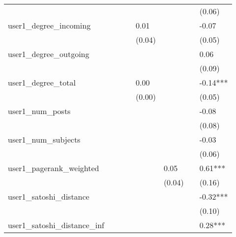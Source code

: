 \begin{table}
\begin{center}
\begin{tabular}{llllllll}
                                      &          &            &         &         &          &             & (0.06)        \\
user1_degree_incoming                 &          &            &         & 0.01    &          &             & -0.07         \\
                                      &          &            &         & (0.04)  &          &             & (0.05)        \\
user1_degree_outgoing                 &          &            &         &         &          &             & 0.06          \\
                                      &          &            &         &         &          &             & (0.09)        \\
user1_degree_total                    &          &            &         & 0.00    &          &             & -0.14***      \\
                                      &          &            &         & (0.00)  &          &             & (0.05)        \\
user1_num_posts                       &          &            &         &         &          &             & -0.08         \\
                                      &          &            &         &         &          &             & (0.08)        \\
user1_num_subjects                    &          &            &         &         &          &             & -0.03         \\
                                      &          &            &         &         &          &             & (0.06)        \\
user1_pagerank_weighted               &          &            &         &         & 0.05     &             & 0.61***       \\
                                      &          &            &         &         & (0.04)   &             & (0.16)        \\
user1_satoshi_distance                &          &            &         &         &          &             & -0.32***      \\
                                      &          &            &         &         &          &             & (0.10)        \\
user1_satoshi_distance_inf            &          &            &         &         &          &             & 0.28***       \\

\end{tabular}
\end{center}
\end{table}
